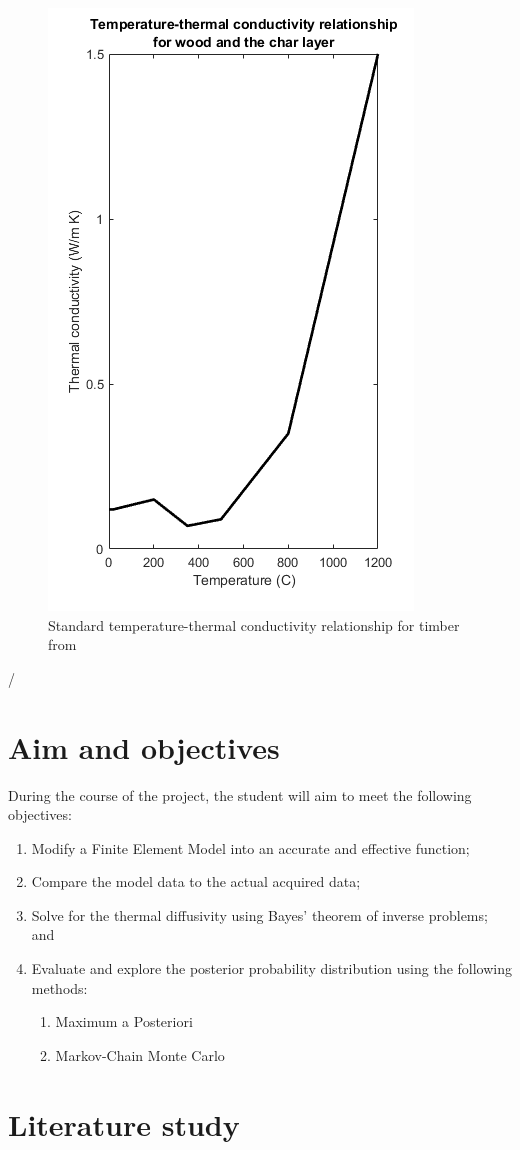 	\begin{figure}
	\label{kvalue_fig}
	\centering
	\includegraphics[width = 0.5\linewidth]{figures/kvalues_euro.png}
	\caption{Standard temperature-thermal conductivity relationship for timber from \citep{Euro:2004}}
	\end{figure}/

\section{Aim and objectives}
During the course of the project, the student will aim to meet the following objectives:
\begin{enumerate}
 \item Modify a Finite Element Model into an accurate and effective function;
 \item Compare the model data to the actual acquired data;
 \item Solve for the thermal diffusivity using Bayes' theorem of inverse problems; and
 \item Evaluate and explore the posterior probability distribution using the following methods:
 	\begin{enumerate}
 		\item Maximum a Posteriori
 		\item Markov-Chain Monte Carlo 	
 	\end{enumerate}
\end{enumerate}

\section{Literature study}\label{litstudy}
	
